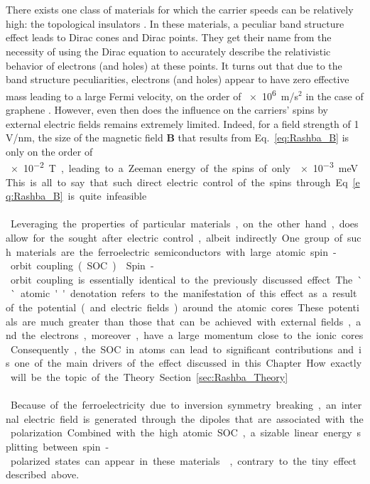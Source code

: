 \\\\
There exists one class of materials for which the carrier speeds can be relatively high: the topological insulators \cite{Kane2005a,Novoselov2005,CastroNeto2009,Fu2007,Fu2006,Pesin2012}.
In these materials, a peculiar band structure effect leads to Dirac cones and Dirac points. They get their name from the necessity of using the Dirac equation to accurately describe the relativistic behavior of electrons (and holes) at these points.
It turns out that due to the band structure peculiarities, electrons (and holes) appear to have zero effective mass leading to a large Fermi velocity, on the order of \SI{e6}m/s$^2$ in the case of graphene \cite{Novoselov2005}.   
However, even then does the influence on the carriers' spins by external electric fields remains extremely limited.
Indeed, for a field strength of 1 V/nm, the size of the magnetic field $\bm B$ that results from Eq.~\eqref{eq:Rashba_B} is only on the order of \SI{e-2} T, leading to a Zeeman energy of the spins of only \SI{e-3} meV.
This is all to say that such direct electric control of the spins through Eq.~\eqref{eq:Rashba_B} is quite infeasible.
\\\\
Leveraging the properties of particular materials, on the other hand, does allow for the sought after electric control, albeit indirectly.
One group of such materials are the ferroelectric semiconductors with large atomic spin-orbit coupling (SOC) \cite{Picozzi2014,DiSante2013,Ishizaka2011,Kim2014}.
Spin-orbit coupling is essentially identical to the previously discussed effect.
The ``atomic'' denotation refers to the manifestation of this effect as a result of the potential (and electric fields) around the atomic cores.
These potentials are much greater than those that can be achieved with external fields, and the electrons, moreover, have a large momentum close to the ionic cores.
Consequently, the SOC in atoms can lead to significant contributions and is one of the main drivers of the effect discussed in this Chapter.
How exactly will be the topic of the Theory Section~\ref{sec:Rashba_Theory}.
\\\\
Because of the ferroelectricity due to inversion symmetry breaking, an internal electric field is generated through the dipoles that are associated with the polarization.
Combined with the high atomic SOC, a sizable linear energy splitting between spin-polarized states can appear in these materials \cite{DiSante2013}, contrary to the tiny effect described above.
